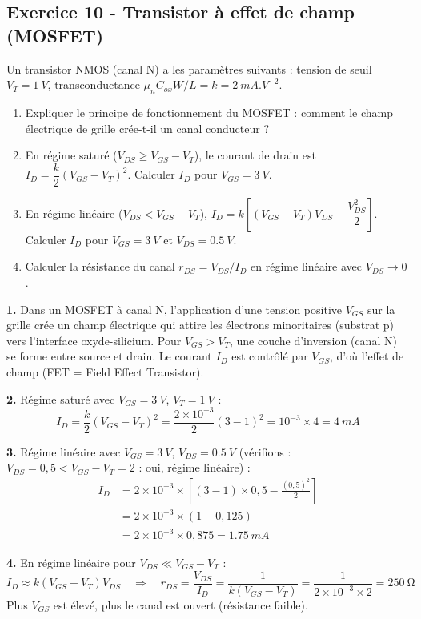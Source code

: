 \documentclass[12pt,a4paper]{article}
\begin{document}
\subsection*{Exercice 10 - Transistor à effet de champ (MOSFET) \niveau{\difficile}}

\begin{boiteexercice}
Un transistor NMOS (canal N) a les paramètres suivants : tension de seuil $V_T = \qty{1}{V}$, transconductance $\mu_n C_{ox} W/L = k = \qty{2}{mA.V^{-2}}$.
\begin{enumerate}
  \item Expliquer le principe de fonctionnement du MOSFET : comment le champ électrique de grille crée-t-il un canal conducteur ?
  \item En régime saturé ($V_{DS} \geq V_{GS} - V_T$), le courant de drain est $I_D = \dfrac{k}{2}(V_{GS}-V_T)^2$. Calculer $I_D$ pour $V_{GS} = \qty{3}{V}$.
  \item En régime linéaire ($V_{DS} < V_{GS}-V_T$), $I_D = k\left[(V_{GS}-V_T)V_{DS} - \dfrac{V_{DS}^2}{2}\right]$. Calculer $I_D$ pour $V_{GS} = \qty{3}{V}$ et $V_{DS} = \qty{0.5}{V}$.
  \item Calculer la résistance du canal $r_{DS} = V_{DS}/I_D$ en régime linéaire avec $V_{DS} \to 0$.
\end{enumerate}
\end{boiteexercice}

\begin{boitecorrige}
\textbf{1.} Dans un MOSFET à canal N, l'application d'une tension positive $V_{GS}$ sur la grille crée un champ électrique qui attire les électrons minoritaires (substrat p) vers l'interface oxyde-silicium. Pour $V_{GS} > V_T$, une couche d'inversion (canal N) se forme entre source et drain. Le courant $I_D$ est contrôlé par $V_{GS}$, d'où l'effet de champ (FET = Field Effect Transistor).

\textbf{2.} Régime saturé avec $V_{GS} = \qty{3}{V}$, $V_T = \qty{1}{V}$ :
\[
I_D = \frac{k}{2}(V_{GS}-V_T)^2
   = \frac{2\times10^{-3}}{2}(3-1)^2
   = 10^{-3}\times4 = \qty{4}{mA}
\]

\textbf{3.} Régime linéaire avec $V_{GS} = \qty{3}{V}$, $V_{DS} = \qty{0.5}{V}$ (vérifions : $V_{DS} = 0{,}5 < V_{GS}-V_T = 2$ : oui, régime linéaire) :
\begin{align*}
I_D &= 2\times10^{-3}\times\left[(3-1)\times0{,}5 - \frac{(0{,}5)^2}{2}\right]\\
    &= 2\times10^{-3}\times(1 - 0{,}125)\\
    &= 2\times10^{-3}\times0{,}875 = \qty{1.75}{mA}
\end{align*}

\textbf{4.} En régime linéaire pour $V_{DS} \ll V_{GS}-V_T$ :
\[
I_D \approx k(V_{GS}-V_T)V_{DS} \quad\Rightarrow\quad r_{DS} = \frac{V_{DS}}{I_D} = \frac{1}{k(V_{GS}-V_T)} = \frac{1}{2\times10^{-3}\times2} = \qty{250}{\ohm}
\]
Plus $V_{GS}$ est élevé, plus le canal est ouvert (résistance faible).
\end{boitecorrige}

\ifdefined\inMainDoc\else
\end{document}
